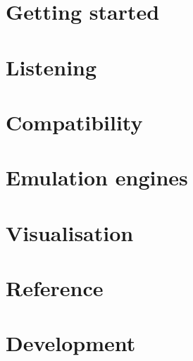 \documentclass[11pt,a4paper,twoside,openright]{book}
\begin{document}
\frontmatter


\tableofcontents


\mainmatter
\part{Getting started}




\part{Listening}




\part{Compatibility}\label{part:compat}





\part{Emulation engines}



\part{Visualisation}





\part{Reference}





\part{Development}




\appendix




\end{document}
